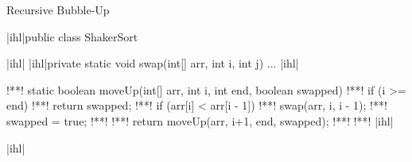 {
\begin{frame}[c,fragile]{Recursive Bubble-Up}
\SetupLstHl
\begin{plainjava}
|ihl|public class ShakerSort {|ihl|
    |ihl|private static void swap(int[] arr, int i, int j) { ... }|ihl|

!**!    static boolean moveUp(int[] arr, int i, int end, boolean swapped) {
!**!        if (i >= end)
!**!            return swapped;
!**!        if (arr[i] < arr[i - 1]) {
!**!            swap(arr, i, i - 1);
!**!            swapped = true;
!**!        }
!**!        return moveUp(arr, i+1, end, swapped);
!**!    }!**!
|ihl|}|ihl|
\end{plainjava}
\end{frame}
}

